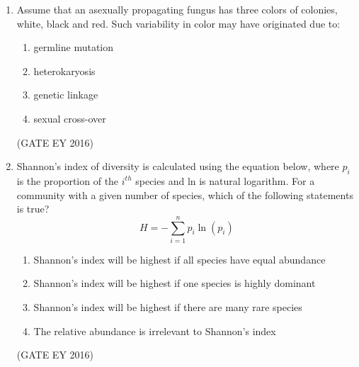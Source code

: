 \documentclass[journal]{IEEEtran}
\begin{document}
\begin{enumerate}[label=Q.\arabic*.]
 


\item Assume that an asexually propagating fungus has three colors of colonies, white, black and red. Such variability in color may have originated due to:
\begin{multicols}{2}
\begin{enumerate}
    \item germline mutation
    \item heterokaryosis
    \item genetic linkage
    \item sexual cross-over
\end{enumerate}
\end{multicols}
\hfill{(GATE EY 2016)}

\item Shannon's index of diversity is calculated using the equation below, where $p_i$ is the proportion of the $i^{th}$ species and ln is natural logarithm. For a community with a given number of species, which of the following statements is true?
$$ H = -\sum_{i=1}^{n} p_i \ln(p_i) $$
\begin{enumerate}
    \item Shannon's index will be highest if all species have equal abundance
    \item Shannon's index will be highest if one species is highly dominant
    \item Shannon's index will be highest if there are many rare species
    \item The relative abundance is irrelevant to Shannon's index
\end{enumerate}
\hfill{(GATE EY 2016)}


\end{enumerate}
\end{document}
